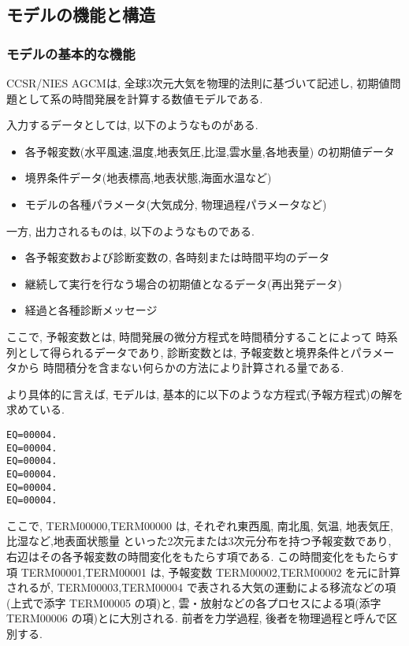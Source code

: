 ﻿%

\subsection{モデルの機能と構造}
\subsubsection{モデルの基本的な機能}

CCSR/NIES AGCMは, 全球3次元大気を物理的法則に基づいて記述し, 
初期値問題として系の時間発展を計算する数値モデルである.

入力するデータとしては, 以下のようなものがある.
\begin{itemize}
\item 各予報変数(水平風速,温度,地表気圧,比湿,雲水量,各地表量) の初期値データ
\item 境界条件データ(地表標高,地表状態,海面水温など)
\item モデルの各種パラメータ(大気成分, 物理過程パラメータなど)
\end{itemize}
%
一方, 出力されるものは, 以下のようなものである.
\begin{itemize}
\item 各予報変数および診断変数の, 各時刻または時間平均のデータ
\item 継続して実行を行なう場合の初期値となるデータ(再出発データ)
\item 経過と各種診断メッセージ
\end{itemize}
%
ここで, 予報変数とは, 時間発展の微分方程式を時間積分することによって
時系列として得られるデータであり,
診断変数とは, 予報変数と境界条件とパラメータから
時間積分を含まない何らかの方法により計算される量である.

より具体的に言えば,
モデルは, 基本的に以下のような方程式(予報方程式)の解を求めている.

\begin{verbatim}
EQ=00004.
EQ=00004.
EQ=00004.
EQ=00004.
EQ=00004.
EQ=00004.
\end{verbatim}

ここで, TERM00000,TERM00000 は, 
それぞれ東西風, 南北風, 気温, 地表気圧,比湿など,地表面状態量
といった2次元または3次元分布を持つ予報変数であり,
右辺はその各予報変数の時間変化をもたらす項である.
この時間変化をもたらす項 TERM00001,TERM00001 は,  
予報変数 TERM00002,TERM00002 を元に計算されるが,
TERM00003,TERM00004 で表される大気の運動による移流などの項(上式で添字 TERM00005 の項)と,
雲・放射などの各プロセスによる項(添字 TERM00006 の項)とに大別される.
前者を力学過程, 後者を物理過程と呼んで区別する.

